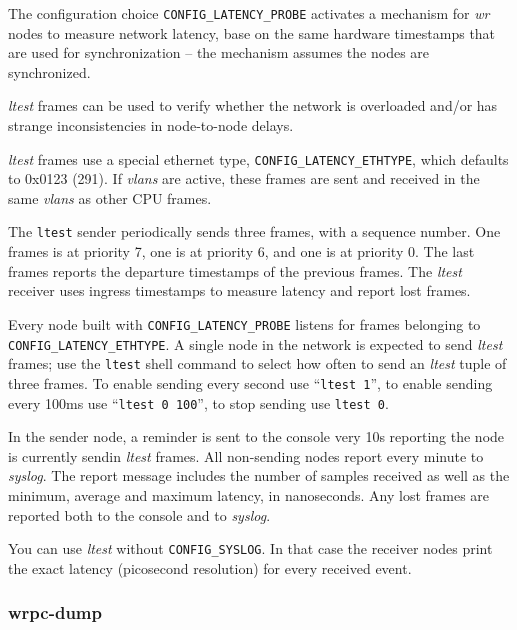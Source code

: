 \documentclass[a4paper, 12pt]{article}
\begin{document}
\begin{sloppypar} %
The configuration choice \texttt{CONFIG\_LATENCY\_PROBE} activates a
mechanism for \textit{wr} nodes to measure network latency, base on the same
hardware timestamps that are used for synchronization -- the mechanism
assumes the nodes are synchronized.

\textit{ltest} frames can be used to verify whether the network is
overloaded and/or has strange inconsistencies in node-to-node delays.

\textit{ltest} frames use a special ethernet type, \texttt{CONFIG\_LATENCY\_ETHTYPE},
which defaults to 0x0123 (291). If \textit{vlans} are active, these frames
are sent and received in the same \textit{vlans} as other CPU frames.

The \texttt{ltest} sender periodically sends three frames, with a sequence
number. One frames is at priority 7, one is at priority 6, and one is
at priority 0. The last frames reports the departure timestamps of the
previous frames.  The \textit{ltest} receiver uses ingress timestamps to
measure latency and report lost frames.

Every node built with \texttt{CONFIG\_LATENCY\_PROBE} listens for frames
belonging to \texttt{CONFIG\_LATENCY\_ETHTYPE}.  A single node in the
network is expected to send \textit{ltest} frames; use the \texttt{ltest}
shell command to select how often to send an \textit{ltest} tuple of three
frames. To enable sending every second use ``\texttt{ltest 1}'', to enable
sending every 100ms use ``\texttt{ltest 0 100}'', to stop sending use
\texttt{ltest 0}.

In the sender node, a reminder is sent to the console very 10s
reporting the node is currently sendin \textit{ltest} frames.  All
non-sending nodes report every minute to \textit{syslog}. The
report message includes the number of samples received as well
as the minimum, average and maximum latency, in nanoseconds.
Any lost frames are reported both to the console and to \textit{syslog}.

You can use \textit{ltest} without \texttt{CONFIG\_SYSLOG}. In that case the
receiver nodes print the exact latency (picosecond resolution) for
every received event.
\end{sloppypar}

\subsubsection{wrpc-dump}
\label{wrpc-dump}
\end{document}
